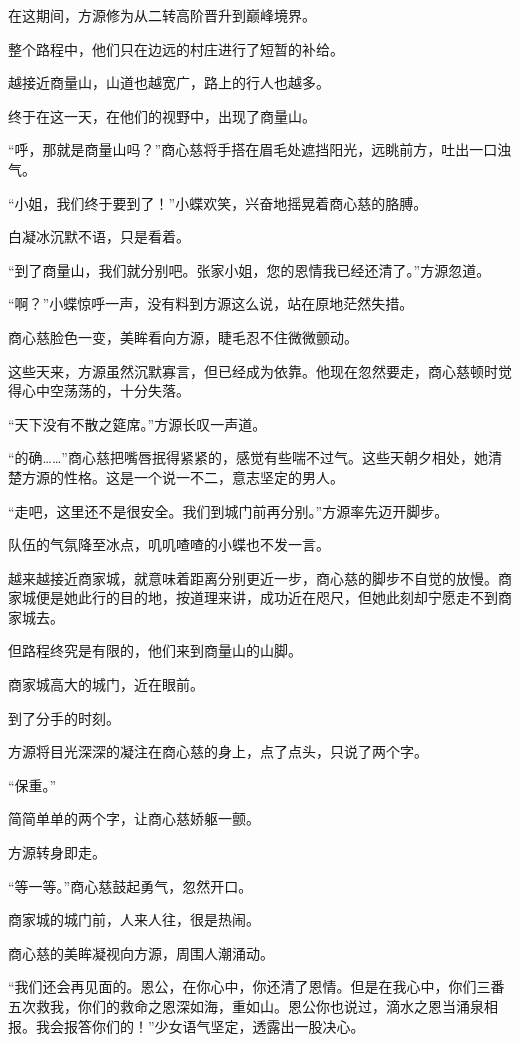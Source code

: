 \begin{this_body}
在这期间，方源修为从二转高阶晋升到巅峰境界。

整个路程中，他们只在边远的村庄进行了短暂的补给。

越接近商量山，山道也越宽广，路上的行人也越多。

终于在这一天，在他们的视野中，出现了商量山。

“呼，那就是商量山吗？”商心慈将手搭在眉毛处遮挡阳光，远眺前方，吐出一口浊气。

“小姐，我们终于要到了！”小蝶欢笑，兴奋地摇晃着商心慈的胳膊。

白凝冰沉默不语，只是看着。

“到了商量山，我们就分别吧。张家小姐，您的恩情我已经还清了。”方源忽道。

“啊？”小蝶惊呼一声，没有料到方源这么说，站在原地茫然失措。

商心慈脸色一变，美眸看向方源，睫毛忍不住微微颤动。

这些天来，方源虽然沉默寡言，但已经成为依靠。他现在忽然要走，商心慈顿时觉得心中空荡荡的，十分失落。

“天下没有不散之筵席。”方源长叹一声道。

“的确……”商心慈把嘴唇抿得紧紧的，感觉有些喘不过气。这些天朝夕相处，她清楚方源的性格。这是一个说一不二，意志坚定的男人。

“走吧，这里还不是很安全。我们到城门前再分别。”方源率先迈开脚步。

队伍的气氛降至冰点，叽叽喳喳的小蝶也不发一言。

越来越接近商家城，就意味着距离分别更近一步，商心慈的脚步不自觉的放慢。商家城便是她此行的目的地，按道理来讲，成功近在咫尺，但她此刻却宁愿走不到商家城去。

但路程终究是有限的，他们来到商量山的山脚。

商家城高大的城门，近在眼前。

到了分手的时刻。

方源将目光深深的凝注在商心慈的身上，点了点头，只说了两个字。

“保重。”

简简单单的两个字，让商心慈娇躯一颤。

方源转身即走。

“等一等。”商心慈鼓起勇气，忽然开口。

商家城的城门前，人来人往，很是热闹。

商心慈的美眸凝视向方源，周围人潮涌动。

“我们还会再见面的。恩公，在你心中，你还清了恩情。但是在我心中，你们三番五次救我，你们的救命之恩深如海，重如山。恩公你也说过，滴水之恩当涌泉相报。我会报答你们的！”少女语气坚定，透露出一股决心。


\end{this_body}
